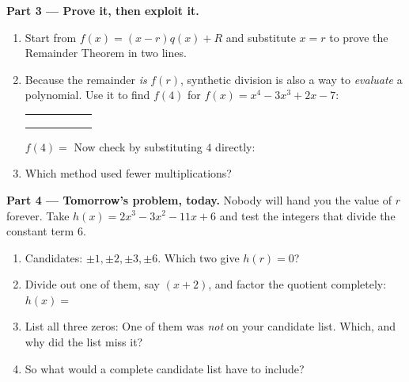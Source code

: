 \documentclass[10pt]{article}
\begin{document}
\begin{tcolorbox}[colback=white, colframe=black!40, title=\textbf{Tier E --- Extension},
    fonttitle=\bfseries, arc=1.5mm, left=3mm, right=3mm, top=2mm, bottom=2mm, breakable]
\vspace{5pt}
\textbf{Part 3 --- Prove it, then exploit it.}
\begin{enumerate}[label=(\alph*), leftmargin=1.8em, itemsep=6pt]
  \item Start from $f(x) = (x-r)q(x) + R$ and substitute $x = r$ to prove the Remainder Theorem in
        two lines. 
  \item Because the remainder \emph{is} $f(r)$, synthetic division is also a way to \emph{evaluate} a
        polynomial. Use it to find $f(4)$ for $f(x) = x^4 - 3x^3 + 2x - 7$:
    \begin{center}
    \renewcommand{\arraystretch}{1.6}
    \begin{tabular}{r|C{1.3cm}C{1.3cm}C{1.3cm}C{1.3cm}C{1.3cm}}
        &     &     &     &     &     \\
        &     &     &     &     &     \\ 
        &     &     &     &     &     \\
    \end{tabular}
    \end{center}
    $f(4) = $ \blank{1.6cm} \; Now check by substituting $4$ directly: \blank{4.0cm}
  \item Which method used fewer multiplications? \blank{4.0cm}
\end{enumerate}

\vspace{5pt}
\textbf{Part 4 --- Tomorrow's problem, today.} Nobody will hand you the value of $r$ forever. Take
$h(x) = 2x^3 - 3x^2 - 11x + 6$ and test the integers that divide the constant term $6$.
\begin{enumerate}[label=(\alph*), leftmargin=1.8em, itemsep=6pt]
  \item Candidates: $\pm 1, \pm 2, \pm 3, \pm 6$. Which two give $h(r) = 0$? \blank{3.0cm}
  \item Divide out one of them, say $(x+2)$, and factor the quotient completely:
        $h(x) = $ \blank{5.4cm}
  \item List all three zeros: \blank{3.6cm} \; One of them was \emph{not} on your candidate list.
        Which, and why did the list miss it? 
  \item So what would a complete candidate list have to include? \writeline
\end{enumerate}
\end{tcolorbox}
\end{document}

